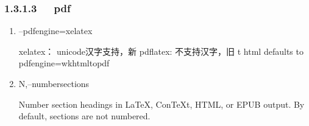 \documentclass[letterpaper,12pt,english]{sphinxmanual}
\begin{document}
\begin{enumerate}
\begin{itemize}
\end{itemize}

\end{enumerate}


\subsubsection{1.3.1.3   pdf}
\label{\detokenize{001software/001install/pandoc:pdf}}\begin{enumerate}
%
\item {} 
–pdf\sphinxhyphen{}engine=xelatex

\begin{sphinxVerbatim}[commandchars=\\\{\}]
xelatex： unicode汉字支持，新
pdflatex: 不支持汉字，旧
\PYGZhy{}t html defaults to \PYGZhy{}\PYGZhy{}pdf\PYGZhy{}engine=wkhtmltopdf
\end{sphinxVerbatim}

\item {} 
\sphinxhyphen{}N,–number\sphinxhyphen{}sections

Number section headings in LaTeX, ConTeXt, HTML, or EPUB output. By
default, sections are not numbered.

\end{enumerate}
\end{document}
